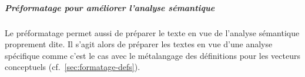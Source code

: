 \subparagraph{Préformatage pour améliorer l'analyse sémantique}

Le préformatage permet aussi de préparer le texte en vue de l'analyse
sémantique proprement dite. Il s'agit alors de préparer les textes en
vue d'une analyse spécifique comme c'est le cas avec le métalangage
des définitions pour les vecteurs conceptuels
(cf.~\ref{sec:formatage-defs}).






